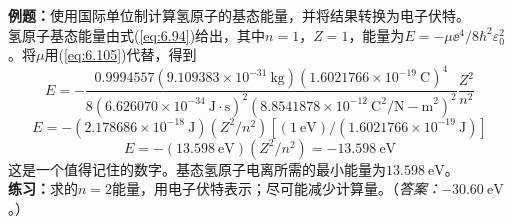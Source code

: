     \begin{examplebox}
        \textbf{例题：}使用国际单位制计算氢原子的基态能量，并将结果转换为电子伏特。
        \\

        氢原子基态能量由式(\ref{eq:6.94})给出，其中$n=1$，$Z=1$，能量为$E = -\mu\ee ^4/8\hbar^2\varepsilon_0^2$。将$\mu$用(\ref{eq:6.105})代替，得到
        \begin{equation*}
            E = -\frac{0.9994557\left(9.109383 \times 10^{-31} \: \mathrm{kg}\right)\left(1.6021766 \times 10^{-19} \: \mathrm{C}\right)^4}{8\left(6.626070 \times 10^{-34} \: \mathrm{J} \cdot \mathrm{s}\right)^2\left(8.8541878 \times 10^{-12} \: \mathrm{C}^2/\mathrm{N-m}^2\right)^2}\frac{Z^2}{n^2}
        \end{equation*}
        \begin{equation*}
            E = -\left(2.178686 \times 10^{-18} \: \mathrm{J}\right)\left(Z^2/n^2\right)\left[\left(1\:\mathrm{eV}\right)/\left(1.6021766 \times 10^{-19} \: \mathrm{J}\right)\right]
        \end{equation*}
        \begin{equation}
            E = -\left(13.598 \: \mathrm{eV}\right)\left(Z^2/n^2\right) = -13.598 \: \mathrm{eV}
            \label{eq:6.108}
        \end{equation}
        这是一个值得记住的数字。基态氢原子电离所需的最小能量为$13.598 \: \mathrm{eV}$。
        \\

        \textbf{练习：}求的$n=2$能量，用电子伏特表示；尽可能减少计算量。（\textit{答案：}$-30.60 \: \mathrm{eV}$。）
    \end{examplebox}


